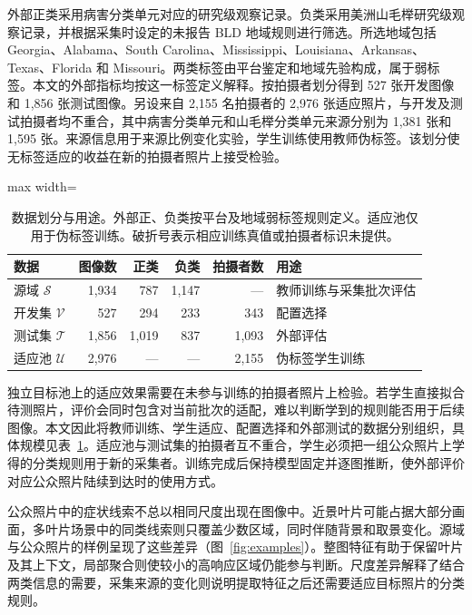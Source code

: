 \documentclass[11pt,a4paper,UTF8,fontset=windows,scheme=plain]{ctexart}
\begin{document}
外部正类采用病害分类单元对应的研究级观察记录。负类采用美洲山毛榉研究级观察记录，并根据采集时设定的未报告 BLD 地域规则进行筛选。所选地域包括 Georgia、Alabama、South Carolina、Mississippi、Louisiana、Arkansas、Texas、Florida 和 Missouri。两类标签由平台鉴定和地域先验构成，属于弱标签。本文的外部指标均按这一标签定义解释。按拍摄者划分得到 527 张开发图像和 1,856 张测试图像。另设来自 2,155 名拍摄者的 2,976 张适应照片，与开发及测试拍摄者均不重合，其中病害分类单元和山毛榉分类单元来源分别为 1,381 张和 1,595 张。来源信息用于来源比例变化实验，学生训练使用教师伪标签。该划分使无标签适应的收益在新的拍摄者照片上接受检验。

\begin{table}[htbp]
\centering\small
\caption{数据划分与用途。外部正、负类按平台及地域弱标签规则定义。适应池仅用于伪标签训练。破折号表示相应训练真值或拍摄者标识未提供。}
\label{tab:data}
\begin{adjustbox}{max width=\linewidth}
\begin{tabular}{lrrrrl}
\toprule
数据 & 图像数 & 正类 & 负类 & 拍摄者数 & 用途\\
\midrule
源域 $\mathcal S$ & 1,934 & 787 & 1,147 & --- & 教师训练与采集批次评估\\
开发集 $\mathcal V$ & 527 & 294 & 233 & 343 & 配置选择\\
测试集 $\mathcal T$ & 1,856 & 1,019 & 837 & 1,093 & 外部评估\\
适应池 $\mathcal U$ & 2,976 & --- & --- & 2,155 & 伪标签学生训练\\
\bottomrule
\end{tabular}
\end{adjustbox}
\end{table}

独立目标池上的适应效果需要在未参与训练的拍摄者照片上检验。若学生直接拟合待测照片，评价会同时包含对当前批次的适配，难以判断学到的规则能否用于后续图像。本文因此将教师训练、学生适应、配置选择和外部测试的数据分别组织，具体规模见表~\ref{tab:data}。适应池与测试集的拍摄者互不重合，学生必须把一组公众照片上学得的分类规则用于新的采集者。训练完成后保持模型固定并逐图推断，使外部评价对应公众照片陆续到达时的使用方式。

公众照片中的症状线索不总以相同尺度出现在图像中。近景叶片可能占据大部分画面，多叶片场景中的同类线索则只覆盖少数区域，同时伴随背景和取景变化。源域与公众照片的样例呈现了这些差异（图~\ref{fig:examples}）。整图特征有助于保留叶片及其上下文，局部聚合则使较小的高响应区域仍能参与判断。尺度差异解释了结合两类信息的需要，采集来源的变化则说明提取特征之后还需要适应目标照片的分类规则。
\end{document}
